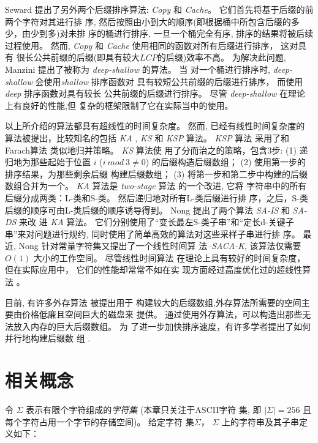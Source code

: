 Seward \cite{Seward2000} 提出了另外两个后缀排序算法:
\emph{Copy} 和 \emph{Cache}。 它们首先将基于后缀的前两个字符对其进行排
序, 然后按照由小到大的顺序(即根据桶中所包含后缀的多少，由少到多)对未排
序的桶进行排序, 一旦一个桶完全有序, 排序的结果将被后续过程使用。 然而,
\emph{Copy} 和 \emph{Cache} 使用相同的函数对所有后缀进行排序， 这对具有
很长公共前缀的后缀(即具有较大$LCP$的后缀)效率不高。 为解决此问题,
Manzini \cite{Manzini2004} 提出了被称为 \emph{deep-shallow} 的算法。 当
对一个桶进行排序时, \emph{deep-shallow} 会使用\emph{shallow} 排序函数对
具有较短公共前缀的后缀进行排序， 而使用 \emph{deep} 排序函数对具有较长
公共前缀的后缀进行排序。 尽管 \emph{deep-shallow} 在理论上有良好的性能,但
复杂的框架限制了它在实际当中的使用。

以上所介绍的算法都具有超线性的时间复杂度。 然而, 已经有线性时间复杂度的
算法被提出，比较知名的包括 \emph{KA} \cite{Ko2005}, \emph{KS}
\cite{Karkkainen2006} 和 \emph{KSP}\cite{Kim2005} 算法。 \emph{KSP} 算法
采用了和Farach算法 \cite{Farach1997} 类似地归并策略。 \emph{KS} 算法使
用了分而治之的策略，包含3步: (1) 递归地为那些起始于位置 $i$ ($i~mod~3
\neq 0$) 的后缀构造后缀数组； (2) 使用第一步的排序结果，为那些剩余后缀
构建后缀数组； (3) 将第一步和第二步中构建的后缀数组合并为一个。
\emph{KA} 算法是 \emph{two-stage} 算法\cite{Itoh1999} 的一个改进, 它将
字符串中的所有后缀分成两类：L-类和S-类。 然后递归地对所有L-类后缀进行排
序，之后，S-类后缀的顺序可由L-类后缀的顺序诱导得到。 Nong
\cite{Nong2011}提出了两个算法 \emph{SA-IS} 和 \emph{SA-DS} 来改
进 \emph{KA} 算法。 它们分别使用了“变长最左S-类子串”和“定长d-关键子
串”来对问题进行规约, 同时使用了简单高效的算法对这些采样子串进行排
序。 最近, Nong\cite{Nong2013} 针对常量字符集又提出了一个线性时间算
法--\emph{SACA-K}, 该算法仅需要 $O(1)$ 大小的工作空间。 尽管线性时间算法
在理论上具有较好的时间复杂度，但在实际应用中， 它们的性能却常常不如在实
现方面经过高度优化过的超线性算法 \cite{Rajasekaran2014}。

目前, 有许多外存算法\cite{Karkkainen2014,Nong2014,Nong2015} 被提出用于
构建较大的后缀数组,外存算法所需要的空间主要由价格低廉且空间巨大的磁盘来
提供。 通过使用外存算法，可以构造出那些无法放入内存的巨大后缀数组。 为
了进一步加快排序速度，有许多学者提出了如何并行地构建后缀数
组 \cite{Schmidt2016,Metwally2016,Flick2015,Deo2013}.

\section{相关概念}
\label{sec:stucture}

令 $\Sigma$ 表示有限个字符组成的\emph{字符集} (本章只关注于ASCII字符
集, 即 $|\Sigma| = 256$ 且每个字符占用一个字节的存储空间)。 给定字符
集$\Sigma$， $\Sigma$ 上的字符串及其子串定义如下：

